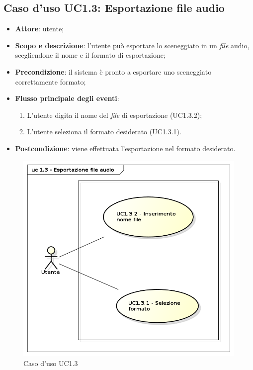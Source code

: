 \subsection{Caso d'uso UC1.3: Esportazione file audio}
\label{sec:UC1.3}

\begin{itemize}
\item \textbf{Attore}: utente;
\item \textbf{Scopo e descrizione}: l'utente può esportare lo sceneggiato in un \textit{file} audio, scegliendone il nome e il formato di esportazione;
\item \textbf{Precondizione}: il sistema è pronto a esportare uno sceneggiato correttamente formato;
\item \textbf{Flusso principale degli eventi}:
\begin{enumerate}
\item L'utente digita il nome del \textit{file} di esportazione (UC1.3.2);
\item L'utente seleziona il formato desiderato (UC1.3.1).
\end{enumerate}
\item \textbf{Postcondizione}: viene effettuata l'esportazione nel formato desiderato.  
\end{itemize}
\begin{figure}[htbp]
\centering
\includegraphics[scale=0.5]{immagini/uc1_3_esportazione_audio.png}
\captionsetup{labelfont=bf}
\caption{Caso d'uso UC1.3}
\end{figure}
\newpage

